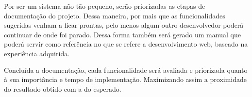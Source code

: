 \documentclass[graduacao,brazil]{ThesisPUC}
\begin{document}
Por ser um sistema não tão pequeno, serão priorizadas as etapas de documentação do projeto. Dessa maneira, por mais que as funcionalidades sugeridas venham a ficar prontas, pelo menos algum outro desenvolvedor poderá continuar de onde foi parado. Dessa forma também será gerado um manual que poderá servir como referência no que se refere a desenvolvimento web, baseado na experiência adquirida.

Concluída a documentação, cada funcionalidade será avaliada e priorizada quanto à sua importância e tempo de implementação. Maximizando assim a proximidade do resultado obtido com a do esperado.

\arial
\nocite{*}


\normalfont
\end{document}
